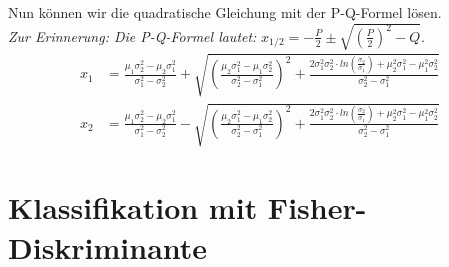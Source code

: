 \documentclass[12pt]{article}
\begin{document}
Nun k\"onnen wir die quadratische Gleichung mit der P-Q-Formel l\"osen.\\
\textit{Zur Erinnerung: Die P-Q-Formel lautet:} $x_{1/2} = -\frac{P}{2} \pm \sqrt{\left(\frac{P}{2}\right)^2 - Q}$.
\begin{align*}
x_1 &= \frac{\mu_1\sigma_2^2 - \mu_2\sigma_1^2}{\sigma_1^2-\sigma_2^2} + \sqrt{\left( \frac{\mu_2\sigma_1^2 - \mu_1\sigma_2^2}{\sigma_2^2-\sigma_1^2} \right)^2 + \frac{2 \sigma_1^2 \sigma_2^2 \cdot ln \left(\frac{\sigma_2}{\sigma_1}\right) + \mu_2^2\sigma_1^2 - \mu_1^2\sigma_2^2}{\sigma_2^2-\sigma_1^2}}\\
x_2 &= \frac{\mu_1\sigma_2^2 - \mu_2\sigma_1^2}{\sigma_1^2-\sigma_2^2} - \sqrt{\left( \frac{\mu_2\sigma_1^2 - \mu_1\sigma_2^2}{\sigma_2^2-\sigma_1^2} \right)^2 + \frac{2 \sigma_1^2 \sigma_2^2 \cdot ln \left(\frac{\sigma_2}{\sigma_1}\right) + \mu_2^2\sigma_1^2 - \mu_1^2\sigma_2^2}{\sigma_2^2-\sigma_1^2}}
\end{align*}
\newpage

\section{Klassifikation mit Fisher-Diskriminante}
\end{document}
